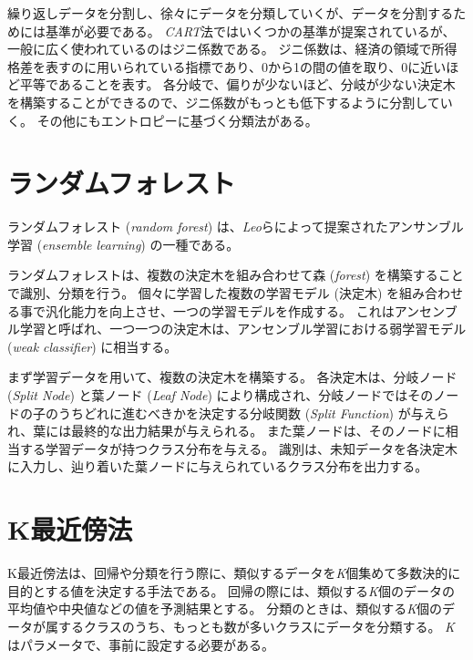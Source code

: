 \documentclass[titlepage,12pt]{jreport}
\begin{document}
繰り返しデータを分割し、徐々にデータを分類していくが、データを分割するためには基準が必要である。 {\it CART}法ではいくつかの基準が提案されているが、一般に広く使われているのはジニ係数である。 ジニ係数は、経済の領域で所得格差を表すのに用いられている指標であり、0から1の間の値を取り、0に近いほど平等であることを表す。 各分岐で、偏りが少ないほど、分岐が少ない決定木を構築することができるので、ジニ係数がもっとも低下するように分割していく。 その他にもエントロピーに基づく分類法がある。

\section{ランダムフォレスト}
ランダムフォレスト ({\it random forest}) は、{\it Leo}らによって提案されたアンサンブル学習 ({\it ensemble learning}) の一種である\cite{random}。

ランダムフォレストは、複数の決定木を組み合わせて森 ({\it forest}) を構築することで識別、分類を行う。 個々に学習した複数の学習モデル (決定木) を組み合わせる事で汎化能力を向上させ、一つの学習モデルを作成する。 これはアンセンブル学習と呼ばれ、一つ一つの決定木は、アンセンブル学習における弱学習モデル ({\it weak classifier}) に相当する。

まず学習データを用いて、複数の決定木を構築する。 各決定木は、分岐ノード ({\it Split Node}) と葉ノード ({\it Leaf Node}) により構成され、分岐ノードではそのノードの子のうちどれに進むべきかを決定する分岐関数 ({\it Split Function}) が与えられ、葉には最終的な出力結果が与えられる。
また葉ノードは、そのノードに相当する学習データが持つクラス分布を与える。 識別は、未知データを各決定木に入力し、辿り着いた葉ノードに与えられているクラス分布を出力する。
\section{K最近傍法}
K最近傍法は、回帰や分類を行う際に、類似するデータを{\it K}個集めて多数決的に目的とする値を決定する手法である。 回帰の際には、類似する{\it K}個のデータの平均値や中央値などの値を予測結果とする。 分類のときは、類似する{\it K}個のデータが属するクラスのうち、もっとも数が多いクラスにデータを分類する。 {\it K}はパラメータで、事前に設定する必要がある。
\end{document}
